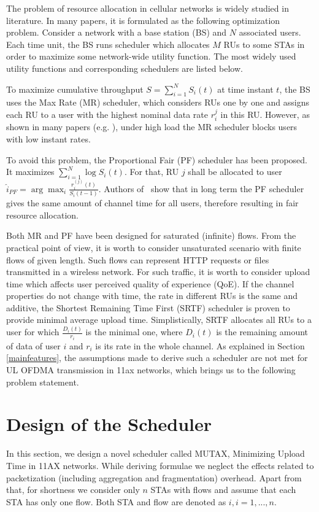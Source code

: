 The problem of resource allocation in cellular networks is widely studied in literature.
In many papers, it is formulated as the following optimization problem.
Consider a network with a base station (BS) and $N$ associated users.
Each time unit, the BS runs scheduler which allocates $M$ RUs to some STAs in order to maximize some network-wide utility function.
The most widely used utility functions and corresponding schedulers are listed below. 

To maximize cumulative throughput $S = \sum\limits_{i=1}^N S_i(t)$ at time instant $t$, the BS uses the Max Rate (MR) scheduler, which considers RUs one by one and assigns each RU to a user with the highest nominal data rate $r_{i}^{j}$ in this RU.
However, as shown in many papers (e.g. \cite{capozzi2013downlink}), under high load the MR scheduler blocks users with low instant rates.

To avoid this problem, the Proportional Fair (PF) scheduler has been proposed.
It maximizes $\sum_{i=1}^{N} \log{S_i(t)}$.
For that, RU $j$ shall be allocated to user $\hat{i}_{PF}= \arg \max_i \frac{r_i^{(j)}(t)}{S_{i}(t-1)}.$
Authors of~\cite{kwan2009proportional} show that in long term the PF scheduler gives the same amount of channel time for all users, therefore resulting in fair resource allocation.

Both MR and PF have been designed for saturated (infinite) flows.
From the practical point of view, it is worth to consider unsaturated scenario with finite flows of given length.
Such flows can represent HTTP requests or files transmitted in a wireless network.
For such traffic, it is worth to consider upload time which affects user perceived quality of experience (QoE).
If the channel properties do not change with time, the rate in different RUs is the same and additive, the Shortest Remaining Time First (SRTF) scheduler is proven to provide minimal average upload time.
Simplistically, SRTF allocates all RUs to a user for which $\frac{D_i(t)}{r_i}$ is the minimal one, where $D_i(t)$ is the remaining amount of data of user $i$ and $r_i$ is its rate in the whole channel.
As explained in Section \ref{mainfeatures}, the assumptions made to derive such a scheduler are not met for UL OFDMA transmission in 11ax networks, which brings us to the following problem statement.


\section{Design of the Scheduler}
In this section, we design a novel scheduler called MUTAX, Minimizing Upload Time in 11AX networks. While deriving formulae we neglect the effects related to packetization (including aggregation and fragmentation) overhead. Apart from that, for shortness we consider only $n$ STAs with flows and assume that each STA has only one flow. Both STA and flow are denoted as $i, i=1,...,n$.

